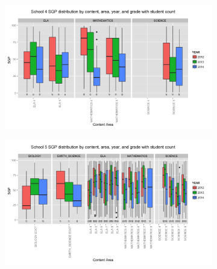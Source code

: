 \documentclass[12pt]{article}
\begin{document}
\begin{figure}[H]
  \begin{subfigure}[b]{\textwidth}
    \includegraphics[width=\textwidth]{../img/Appendices/Appendix_C/School_MSGP_Dist_Boxplot-4.png}
  \end{subfigure}
  \begin{subfigure}[b]{\textwidth}
    \includegraphics[width=\textwidth]{../img/Appendices/Appendix_C/School_MSGP_Dist_Boxplot-5.png}
  \end{subfigure}
\end{figure}



\end{document}
